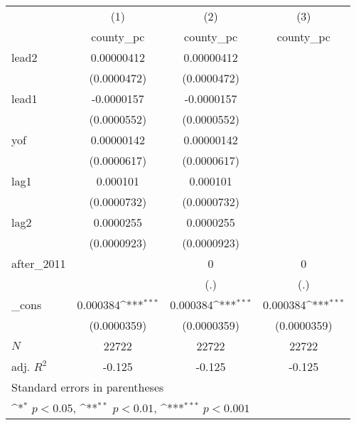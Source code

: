 {
\def\sym#1{\ifmmode^{#1}\else\(^{#1}\)\fi}
\begin{tabular}{l*{3}{c}}
\hline\hline
            &\multicolumn{1}{c}{(1)}&\multicolumn{1}{c}{(2)}&\multicolumn{1}{c}{(3)}\\
            &\multicolumn{1}{c}{county\_pc}&\multicolumn{1}{c}{county\_pc}&\multicolumn{1}{c}{county\_pc}\\
\hline
lead2       &  0.00000412         &  0.00000412         &                     \\
            & (0.0000472)         & (0.0000472)         &                     \\
[1em]
lead1       &  -0.0000157         &  -0.0000157         &                     \\
            & (0.0000552)         & (0.0000552)         &                     \\
[1em]
yof         &  0.00000142         &  0.00000142         &                     \\
            & (0.0000617)         & (0.0000617)         &                     \\
[1em]
lag1        &    0.000101         &    0.000101         &                     \\
            & (0.0000732)         & (0.0000732)         &                     \\
[1em]
lag2        &   0.0000255         &   0.0000255         &                     \\
            & (0.0000923)         & (0.0000923)         &                     \\
[1em]
after\_2011  &                     &           0         &           0         \\
            &                     &         (.)         &         (.)         \\
[1em]
\_cons      &    0.000384\sym{***}&    0.000384\sym{***}&    0.000384\sym{***}\\
            & (0.0000359)         & (0.0000359)         & (0.0000359)         \\
\hline
\(N\)       &       22722         &       22722         &       22722         \\
adj. \(R^{2}\)&      -0.125         &      -0.125         &      -0.125         \\
\hline\hline
\multicolumn{4}{l}{\footnotesize Standard errors in parentheses}\\
\multicolumn{4}{l}{\footnotesize \sym{*} \(p<0.05\), \sym{**} \(p<0.01\), \sym{***} \(p<0.001\)}\\
\end{tabular}
}
